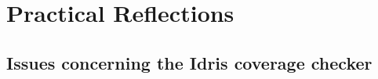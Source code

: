 \section{Practical Reflections}
\label{sec:practical-reflections}

\subsection{Issues concerning the Idris coverage checker}